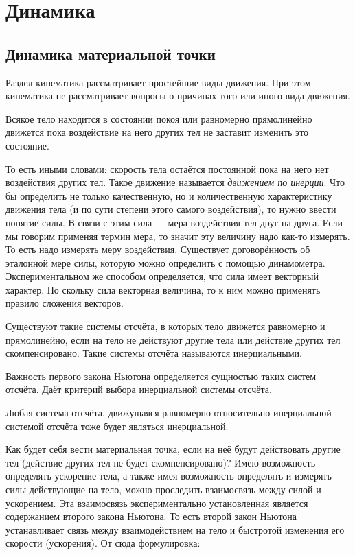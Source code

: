 \chapter{Динамика}
\section{Динамика материальной точки}%

Раздел кинематика рассматривает простейшие виды движения. При этом кинематика
не рассматривает вопросы о причинах того или иного вида движения.

Всякое тело находится в состоянии покоя или равномерно прямолинейно движется
пока воздействие на него других тел не заставит изменить это состояние.

То есть иными словами: скорость тела остаётся постоянной пока на него нет
воздействия других тел. Такое движение называется \emph{движением по инерции}.
Что бы определить не только качественную, но и количественную характеристику
движения тела (и по сути степени этого самого воздействия), то нужно ввести
понятие силы. В связи с этим сила --- мера воздействия тел друг на
друга. Если мы
говорим применяя термин мера, то значит эту величину надо как-то измерять. То
есть надо измерять меру воздействия. Существует договорённость об эталонной
мере силы, которую можно определить с помощью динамометра. Экспериментальном
же способом определяется, что сила имеет векторный характер. По скольку сила
векторная величина, то к ним можно применять правило сложения векторов.

\begin{theorem}
	Существуют такие системы отсчёта, в которых тело движется равномерно и
	прямолинейно, если на тело не  действуют другие тела или действие других тел
	скомпенсировано. Такие системы отсчёта называются инерциальными.
\end{theorem}

Важность первого закона Ньютона определяется сущностью таких систем отсчёта.
Даёт критерий выбора инерциальной системы отсчёта.

Любая система отсчёта, движущаяся равномерно относительно инерциальной системой
отсчёта тоже будет являться инерциальной.

Как будет себя вести материальная точка, если на неё будут действовать другие
тел (действие других тел не будет скомпенсировано)? Имею возможность определять
ускорение тела, а также имея возможность определять и измерять силы действующие
на тело, можно проследить взаимосвязь между силой и ускорением. Эта взаимосвязь
экспериментально установленная является содержанием второго закона Ньютона. То
есть второй закон Ньютона устанавливает связь между взаимодействием на тело и
быстротой изменения его скорости (ускорения). От сюда формулировка:


